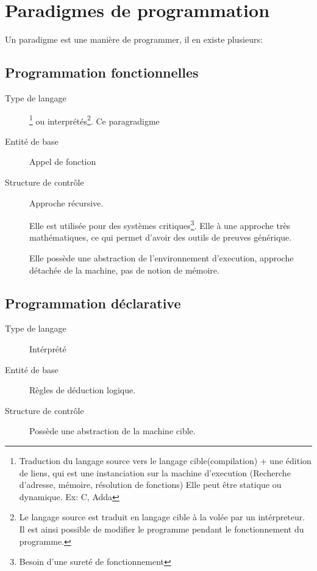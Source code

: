 \documentclass[12pt,a4paper,openany]{article}
\begin{document}
	\setcounter{tocdepth}{2}
	\setcounter{secnumdepth}{3}
	\maketitle
	\section{Paradigmes de programmation}
		Un paradigme est une manière de programmer, il en existe plusieurs: 
		\subsection{Programmation fonctionnelles}
		\begin{description}
		\item[Type de langage] \footnote{Traduction du langage source vers le langage cible(compilation) + une édition de liens, qui est une instanciation sur la machine d'execution (Recherche d'adresse, mémoire, résolution de fonctions) Elle peut être statique ou dynamique. Ex: C, Adda} ou interprétés\footnote{
		Le langage source est traduit en langage cible à la volée par un intérpreteur. Il est ainsi possible de modifier le programme pendant le fonctionnement du programme.}. Ce paragradigme
		\item[Entité de base] Appel de fonction
		\item[Structure de contrôle] Approche récursive. 


		Elle est utilisée pour des systèmes critiques\footnote{Besoin d'une sureté de fonctionnement}. Elle à une approche très mathématiques, ce qui 
		permet d'avoir des outils de preuves générique.

		Elle possède une abstraction de l'environnement d'execution, approche détachée de la machine, pas de notion de mémoire.

	\end{description}
		\subsection{Programmation déclarative}
		\begin{description}
			\item[Type de langage] Intérprété
			\item[Entité de base] Règles de déduction logique.
			\item[Structure de contrôle  ]
			Possède une abstraction de la machine cible.
		\end{description}
\end{document}
